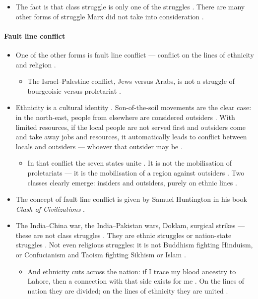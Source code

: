 \begin{itemize}
    \item The fact is that class struggle is only one of the struggles . There are many other forms of struggle Marx did not take into consideration .
\end{itemize}

\paragraph{Fault line conflict}
\begin{itemize}
    \item One of the other forms is fault line conflict --- conflict on the lines of ethnicity and religion .
    \begin{itemize}
        \item The Israel--Palestine conflict, Jews versus Arabs, is not a struggle of bourgeoisie versus proletariat .
    \end{itemize}
    \item Ethnicity is a cultural identity . Son-of-the-soil movements are the clear case: in the north-east, people from elsewhere are considered outsiders . With limited resources, if the local people are not served first and outsiders come and take away jobs and resources, it automatically leads to conflict between locals and outsiders --- whoever that outsider may be .
    \begin{itemize}
        \item In that conflict the seven states unite . It is not the mobilisation of proletariats --- it is the mobilisation of a region against outsiders . Two classes clearly emerge: insiders and outsiders, purely on ethnic lines .
    \end{itemize}
    \item The concept of fault line conflict is given by Samuel Huntington in his book \emph{Clash of Civilizations} .
    \item The India--China war, the India--Pakistan wars, Doklam, surgical strikes --- these are not class struggles . They are ethnic struggles or nation-state struggles . Not even religious struggles: it is not Buddhism fighting Hinduism, or Confucianism and Taoism fighting Sikhism or Islam .
    \begin{itemize}
        \item And ethnicity cuts across the nation: if I trace my blood ancestry to Lahore, then a connection with that side exists for me . On the lines of nation they are divided; on the lines of ethnicity they are united .
    \end{itemize}
\end{itemize}

